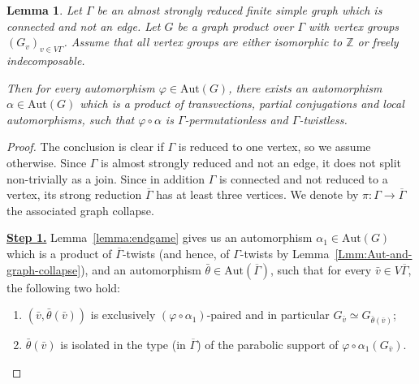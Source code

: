\documentclass[a4paper,english,11pt]{article}
\newtheorem{lemma}[de]{Lemma}
\theoremstyle{definition}
\theoremstyle{remark}
\newcommand{\Aut}{\mathrm{Aut}}
\begin{document}
\begin{lemma}\label{lemma:permutationless}
 Let $\Gamma$ be an almost strongly reduced finite simple graph which is connected and not an edge. Let $G$ be a graph product over $\Gamma$ with vertex groups $(G_v)_{v\in V\Gamma}$. Assume that all vertex groups are either isomorphic to $\mathbb{Z}$ or freely indecomposable. 

Then for every automorphism $\varphi\in\Aut(G)$, there exists an automorphism $\alpha\in\Aut(G)$ which is a product of transvections, partial conjugations and local automorphisms, such that $\varphi\circ\alpha$ is $\Gamma$-permutationless and $\Gamma$-twistless.
\end{lemma}

\begin{proof}
The conclusion is clear if $\Gamma$ is reduced to one vertex, so we assume otherwise. Since $\Gamma$ is almost strongly reduced and not an edge, it does not split non-trivially as a join. Since in addition $\Gamma$ is connected and not reduced to a vertex, its strong reduction $\overline\Gamma$ has at least three vertices. We denote by $\pi:\Gamma\to\overline{\Gamma}$ the associated graph collapse.  

\medskip

\underline{\textbf{Step 1.}} Lemma~\ref{lemma:endgame} gives us an automorphism $\alpha_1\in\Aut(G)$ which is a product of $\overline{\Gamma}$-twists (and hence, of $\Gamma$-twists by Lemma~\ref{Lmm:Aut-and-graph-collapse}), and an automorphism $\bar\theta\in\Aut(\overline{\Gamma})$, such that for every $\bar v\in V\overline{\Gamma}$, the following two hold:
\begin{enumerate}
    \item $(\bar v,\bar\theta(\bar v))$ is exclusively $(\varphi\circ\alpha_1)$-paired and in particular $G_{\bar{v}}\simeq G_{\bar\theta(\bar v)}$;
    \item $\bar\theta(\bar v)$ is isolated in the type (in $\overline{\Gamma}$) of the parabolic support of $\varphi\circ\alpha_1(G_{\bar v})$.
\end{enumerate} 

\medskip


\end{proof}
\end{document}
